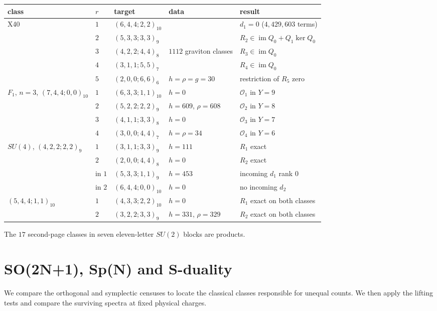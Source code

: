 \documentclass[11pt]{article}
\numberwithin{equation}{section}
\numberwithin{figure}{section}
\numberwithin{table}{section}
\begin{document}
{\small\renewcommand{\arraystretch}{1.25}\setlength{\tabcolsep}{4pt}
\begin{xltabular}{\linewidth}{@{}>{\raggedright\arraybackslash}Xll>{\raggedright\arraybackslash}X>{\raggedright\arraybackslash}X@{}}
\toprule
class & $r$ & target & data & result\\
\midrule\endhead
X40 & $1$ & $(6,4,4;2,2)_{10}$ &  & $d_1=0$ ($4{,}429{,}603$ terms)\\
 & $2$ & $(5,3,3;3,3)_9$ &  & $R_2\in\operatorname{im}Q_0+Q_1\ker Q_0$\\
 & $3$ & $(4,2,2;4,4)_8$ & $1112$ graviton classes & $R_3\in\operatorname{im}Q_0$\\
 & $4$ & $(3,1,1;5,5)_7$ &  & $R_4\in\operatorname{im}Q_0$\\
 & $5$ & $(2,0,0;6,6)_6$ & $h=\rho=g=30$ & restriction of $R_5$ zero\\
$F_1$, $n=3$, $(7,4,4;0,0)_{10}$ & $1$ & $(6,3,3;1,1)_{10}$ & $h=0$ & $\mathcal O_1$ in $Y=9$\\
 & $2$ & $(5,2,2;2,2)_9$ & $h=609$, $\rho=608$ & $\mathcal O_2$ in $Y=8$\\
 & $3$ & $(4,1,1;3,3)_8$ & $h=0$ & $\mathcal O_3$ in $Y=7$\\
 & $4$ & $(3,0,0;4,4)_7$ & $h=\rho=34$ & $\mathcal O_4$ in $Y=6$\\
$SU(4)$, $(4,2,2;2,2)_9$ & $1$ & $(3,1,1;3,3)_9$ & $h=111$ & $R_1$ exact\\
 & $2$ & $(2,0,0;4,4)_8$ & $h=0$ & $R_2$ exact\\
 & in $1$ & $(5,3,3;1,1)_9$ & $h=453$ & incoming $d_1$ rank $0$\\
 & in $2$ & $(6,4,4;0,0)_{10}$ & $h=0$ & no incoming $d_2$\\
$(5,4,4;1,1)_{10}$ & $1$ & $(4,3,3;2,2)_{10}$ & $h=0$ & $R_1$ exact on both classes\\
 & $2$ & $(3,2,2;3,3)_9$ & $h=331$, $\rho=329$ & $R_2$ exact on both classes\\
\bottomrule
\end{xltabular}}

The $17$ second-page classes in seven eleven-letter $SU(2)$ blocks are products.

\section{SO(2N+1), Sp(N) and S-duality}\label{sec-E-SOSp}

We compare the orthogonal and symplectic censuses to locate the classical classes responsible for unequal counts. We then apply the lifting tests and compare the surviving spectra at fixed physical charges.
\end{document}
